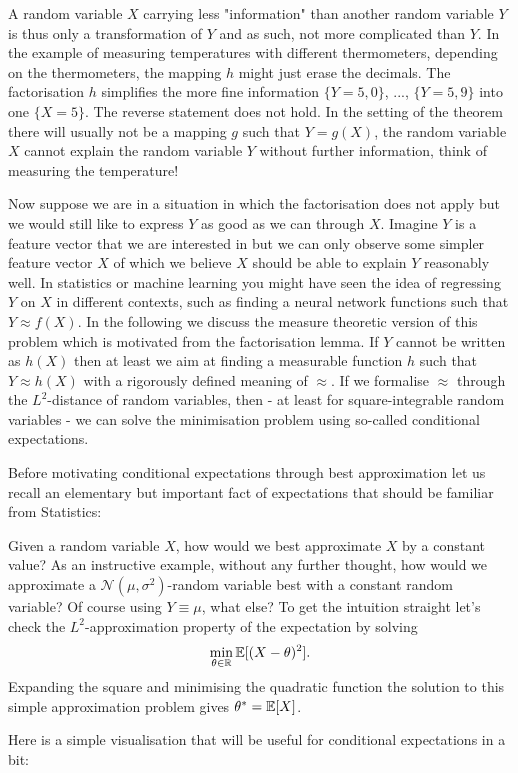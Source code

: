 	 A random variable $X$ carrying less "{}information"{} than another random variable $Y$ is thus only a transformation of $Y$ and as such, not more complicated than $Y$. In the example of measuring temperatures with different thermometers, depending on the thermometers, the mapping $h$ might just erase the decimals. The factorisation $h$ simplifies the more fine information $\{Y=5,0\}$, ..., $\{Y=5,9\}$ into one $\{X=5\}$.  The reverse statement does not hold. In the setting of the theorem there will usually not be a mapping $g$ such that $Y=g(X)$, the random variable $X$ cannot explain the random variable $Y$ without further information, think of measuring the temperature!\smallskip
	
	 Now suppose we are in a situation in which the factorisation does not apply but we would still like to express $Y$ as good as we can through $X$. Imagine $Y$ is a feature vector that we are interested in but we can only observe some simpler feature vector $X$ of which we believe $X$ should be able to explain $Y$ reasonably well. In statistics or machine learning you might have seen the idea of regressing $Y$ on $X$ in different contexts, such as finding a neural network functions such that $Y\approx f(X)$. In the following we discuss the measure theoretic version of this problem which is motivated from the factorisation lemma. If $Y$ cannot be written as $h(X)$ then at least we aim at finding a measurable function $h$ such that $Y\approx h(X)$ with a rigorously defined meaning of $\approx$. If we formalise $\approx$ through the $L^2$-distance of random variables, then - at least for square-integrable random variables - we can solve the minimisation problem using so-called conditional expectations. \smallskip
	 
	 
Before motivating conditional expectations through best approximation let us recall an elementary but important fact of expectations that should be familiar from Statistics:	
\begin{lreminder}
Given a random variable $X$, how would we best approximate $X$ by a constant value? As an instructive example, without any further thought, how would we approximate a $\mathcal N(\mu,\sigma^2)$-random variable best with a constant random variable? Of course using $Y\equiv \mu$, what else? To get the intuition straight let's check the $L^2$-approximation property of the expectation by solving
\begin{align*}
	\min_{\theta\in\mathbb{R}} \mathbb{E}[(X-\theta)^2].
\end{align*}
Expanding the square and minimising the quadratic function the solution to this simple approximation problem gives $\theta^*=\mathbb{E}[X]$. 
\end{lreminder}
Here is a simple visualisation that will be useful for conditional expectations in a bit:

